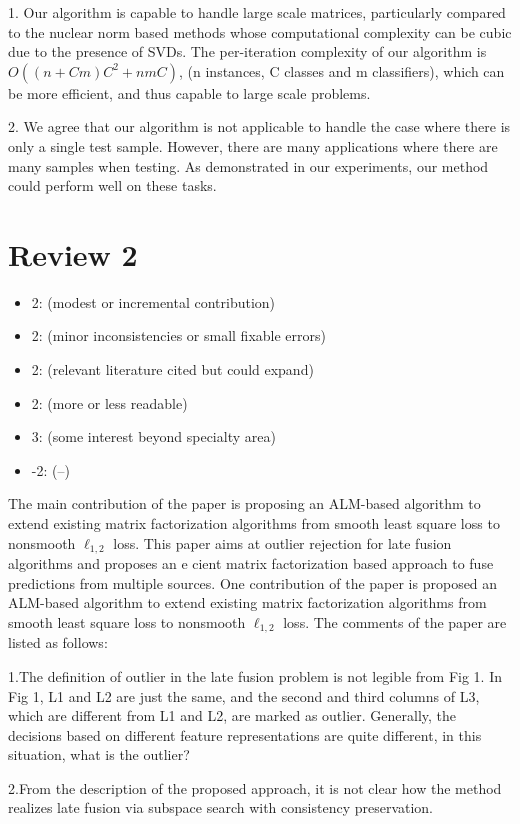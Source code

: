\documentclass[letterpaper]{article}
\begin{document}
1. Our algorithm is capable to handle large scale matrices, particularly compared to the nuclear norm based methods whose computational complexity can be cubic due to the presence of SVDs.
The per-iteration complexity of our algorithm is $O((n+Cm)C^2 +nmC)$,
(n instances, C classes and m classifiers),
which can be more efficient, and thus capable to large scale problems.

2. We agree that our algorithm is not applicable to handle the case where there is only a single test sample. However, there are many applications where there are many samples when testing. As demonstrated in our experiments, our method could perform well on these tasks.


\section{Review 2}
\begin{itemize}
  \item 2: (modest or incremental contribution)
  \item 2: (minor inconsistencies or small fixable errors) 
  \item 2: (relevant literature cited but could expand)
  \item 2: (more or less readable)
  \item 3: (some interest beyond specialty area)
  \item -2: (--)
\end{itemize}

The main contribution of the paper is proposing an ALM-based algorithm to extend existing matrix factorization algorithms from smooth least square loss to nonsmooth $\ell_{1, 2}$ loss.
This paper aims at outlier rejection for late fusion algorithms and proposes an e cient matrix factorization based approach to fuse predictions from multiple sources. One contribution of the paper is proposed an ALM-based algorithm to extend existing matrix factorization algorithms from smooth least square loss to nonsmooth $\ell_{1, 2}$ loss.
The comments of the paper are listed as follows:

1.The definition of outlier in the late fusion problem is not legible from Fig 1. In Fig 1, L1 and L2 are just the same, and the second and third columns of L3, which are different from L1 and L2, are marked as outlier. Generally, the decisions based on different feature representations are quite different, in this situation, what is the outlier?

2.From the description of the proposed approach, it is not clear how the method realizes late fusion via subspace search with consistency preservation.
\end{document}
